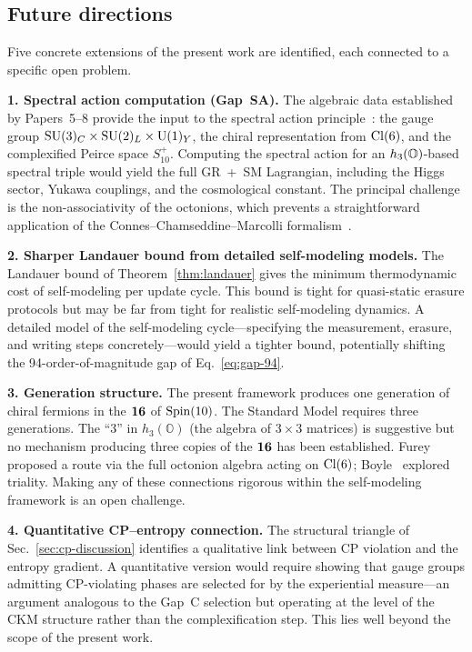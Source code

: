 \subsection{Future directions}\label{sec:future}

Five concrete extensions of the present work are identified, each
connected to a specific open problem.

\medskip\noindent
\textbf{1. Spectral action computation (Gap~SA).}
The algebraic data established by Papers~5--8 provide the input to
the spectral action principle~\cite{CCM2007}: the gauge group
$\mathrm{SU}(3)_C \times \mathrm{SU}(2)_L \times \mathrm{U}(1)_Y$, the chiral representation from $\mathrm{Cl}(6)$, and the
complexified Peirce space $S_{10}^+$.  Computing the spectral action
for an $h_3(\mathbb{O})$-based spectral triple would yield the full GR~+~SM
Lagrangian, including the Higgs sector, Yukawa couplings, and the
cosmological constant.  The principal challenge is the
non-associativity of the octonions, which prevents a straightforward
application of the Connes--Chamseddine--Marcolli
formalism~\cite{CCM2007}.

\medskip\noindent
\textbf{2. Sharper Landauer bound from detailed self-modeling models.}
The Landauer bound of Theorem~\ref{thm:landauer} gives the minimum
thermodynamic cost of self-modeling per update cycle.  This bound
is tight for quasi-static erasure protocols but may be far from tight
for realistic self-modeling dynamics.  A detailed model of the
self-modeling cycle---specifying the measurement, erasure, and writing
steps concretely---would yield a tighter bound, potentially shifting
the 94-order-of-magnitude gap of Eq.~\eqref{eq:gap-94}.

\medskip\noindent
\textbf{3. Generation structure.}
The present framework produces one generation of chiral fermions in
the $\mathbf{16}$ of $\mathrm{Spin}(10)$.  The Standard Model requires three
generations.  The ``3'' in $h_3(\mathbb{O})$ (the algebra of
$3\times 3$ matrices) is suggestive but no mechanism producing three
copies of the $\mathbf{16}$ has been established.
Furey~\cite{Furey2018} proposed a route via the full octonion algebra
acting on $\mathrm{Cl}(6)$; Boyle~\cite{Boyle2020} explored triality.
Making any of these connections rigorous within the self-modeling
framework is an open challenge.

\medskip\noindent
\textbf{4. Quantitative CP--entropy connection.}
The structural triangle of Sec.~\ref{sec:cp-discussion} identifies a
qualitative link between CP violation and the entropy gradient.  A
quantitative version would require showing that gauge groups
admitting CP-violating phases are selected for by the experiential
measure---an argument analogous to the Gap~C selection but operating
at the level of the CKM structure rather than the complexification
step.  This lies well beyond the scope of the present work.

